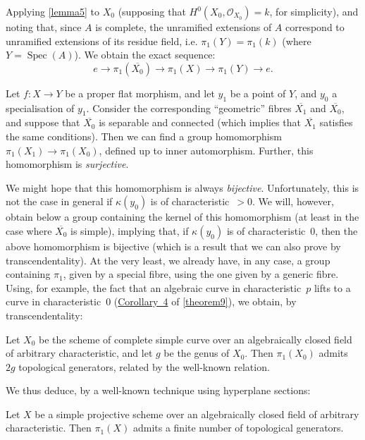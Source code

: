 \documentclass{article}
\theoremstyle{plain}
\newenvironment{corollary}[1]
  {\renewcommand\theinnercustomcorollary{#1}\innercustomcorollary}
  {\endinnercustomcorollary}
\theoremstyle{definition}
\newcommand{\sh}[1]{{\mathscr{#1}}}
\newcommand{\kres}{\kappa}
\DeclareMathOperator{\Spec}{Spec}
\newcommand{\oldpage}[1]{\marginpar{\footnotesize$\Big\vert$ \textit{p.~#1}}}
\begin{document}
Applying \cref{lemma5} to $X_0$ (supposing that $H^0(X_0,\sh{O}_{X_0})=k$, for simplicity), and noting that, since $A$ is complete, the unramified extensions of $A$ correspond to unramified extensions of its residue field, i.e. $\pi_1(Y)=\pi_1(k)$ (where $Y=\Spec(A)$).
We obtain the exact sequence:
\[
  e \to \pi_1(\overline{X_0}) \to \pi_1(X) \to \pi_1(Y) \to e.
\]

\begin{corollary}{2}
\label{theorem12corollary2}
  Let $f\colon X\to Y$ be a proper flat morphism, and let $y_1$ be a point of $Y$, and $y_0$ a specialisation of $y_1$.
  Consider the corresponding ``geometric'' fibres $\overline{X_1}$ and $\overline{X_0}$, and suppose that $\overline{X_0}$ is separable and connected (which implies that $\overline{X_1}$ satisfies the same conditions).
  Then we can find a group homomorphism $\pi_1(X_1)\to\pi_1(X_0)$, defined up to inner automorphism.
  Further, this homomorphism is \emph{surjective}.
\end{corollary}

\oldpage{182-25}
We might hope that this homomorphism is always \emph{bijective}.
Unfortunately, this is not the case in general if $\kres(y_0)$ is of characteristic~$>0$.
We will, however, obtain below a group containing the kernel of this homomorphism (at least in the case where $\overline{X_0}$ is simple), implying that, if $\kres(y_0)$ is of characteristic~$0$, then the above homomorphism is bijective (which is a result that we can also prove by transcendentality).
At the very least, we already have, in any case, a group containing $\pi_1$, given by a special fibre, using the one given by a generic fibre.
Using, for example, the fact that an algebraic curve in characteristic~$p$ lifts to a curve in characteristic~$0$ (\hyperref[theorem9corollary4]{Corollary~4} of \cref{theorem9}), we obtain, by transcendentality:

\begin{corollary}{3}
\label{theorem12corollary3}
  Let $X_0$ be the scheme of complete simple curve over an algebraically closed field of arbitrary characteristic, and let $g$ be the genus of $X_0$.
  Then $\pi_1(X_0)$ admits $2g$ topological generators, related by the well-known relation.
\end{corollary}

We thus deduce, by a well-known technique using hyperplane sections:

\begin{corollary}{4}
\label{theorem12corollary4}
  Let $X$ be a simple projective scheme over an algebraically closed field of arbitrary characteristic.
  Then $\pi_1(X)$ admits a finite number of topological generators.
\end{corollary}
\end{document}
